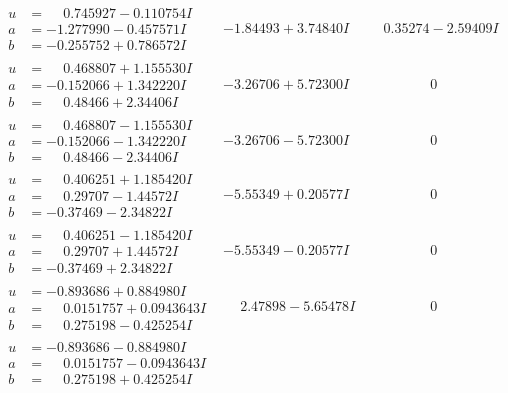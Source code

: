 \documentclass[1p]{elsarticle_modified}
\theoremstyle{definition}
\begin{document}
$$\begin{array}{c|c|c}
\begin{aligned}
u &= \phantom{-}0.745927 - 0.110754 I \\
a &= -1.277990 - 0.457571 I \\
b &= -0.255752 + 0.786572 I\end{aligned}
 & -1.84493 + 3.74840 I & \phantom{-}0.35274 - 2.59409 I \\ \hline\begin{aligned}
u &= \phantom{-}0.468807 + 1.155530 I \\
a &= -0.152066 + 1.342220 I \\
b &= \phantom{-}0.48466 + 2.34406 I\end{aligned}
 & -3.26706 + 5.72300 I & \phantom{-0.000000 } 0 \\ \hline\begin{aligned}
u &= \phantom{-}0.468807 - 1.155530 I \\
a &= -0.152066 - 1.342220 I \\
b &= \phantom{-}0.48466 - 2.34406 I\end{aligned}
 & -3.26706 - 5.72300 I & \phantom{-0.000000 } 0 \\ \hline\begin{aligned}
u &= \phantom{-}0.406251 + 1.185420 I \\
a &= \phantom{-}0.29707 - 1.44572 I \\
b &= -0.37469 - 2.34822 I\end{aligned}
 & -5.55349 + 0.20577 I & \phantom{-0.000000 } 0 \\ \hline\begin{aligned}
u &= \phantom{-}0.406251 - 1.185420 I \\
a &= \phantom{-}0.29707 + 1.44572 I \\
b &= -0.37469 + 2.34822 I\end{aligned}
 & -5.55349 - 0.20577 I & \phantom{-0.000000 } 0 \\ \hline\begin{aligned}
u &= -0.893686 + 0.884980 I \\
a &= \phantom{-}0.0151757 + 0.0943643 I \\
b &= \phantom{-}0.275198 - 0.425254 I\end{aligned}
 & \phantom{-}2.47898 - 5.65478 I & \phantom{-0.000000 } 0 \\ \hline\begin{aligned}
u &= -0.893686 - 0.884980 I \\
a &= \phantom{-}0.0151757 - 0.0943643 I \\
b &= \phantom{-}0.275198 + 0.425254 I\end{aligned}

\end{array}$$
\end{document}
